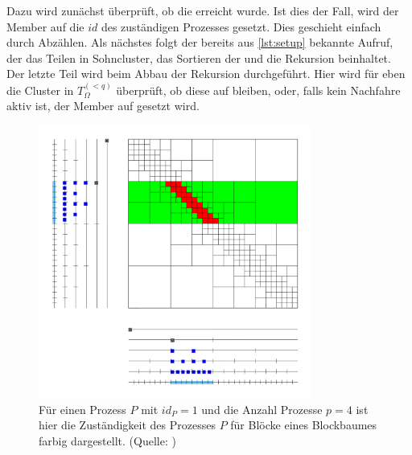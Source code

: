     
    Dazu wird zunächst überprüft, ob die  erreicht wurde. Ist dies der Fall, wird der Member  auf 
    die $id$ des zuständigen Prozesses gesetzt. Dies geschieht einfach durch Abzählen. Als nächstes folgt der bereits aus \autoref{lst:setup} bekannte Aufruf, der das Teilen in Sohncluster, das 
    Sortieren der  und die Rekursion beinhaltet. Der letzte Teil wird beim Abbau der Rekursion durchgeführt. Hier wird für eben die Cluster in $T_\Omega^{(<q)}$ überprüft, ob diese 
    auf  bleiben, oder, falls kein Nachfahre aktiv ist, der Member  auf  gesetzt wird.
    
    \begin{figure}[b]
      \includegraphics[width=0.8\textwidth]{img/verteilter_blockbaum.png}
      \caption{Für einen Prozess $P$ mit $id_P = 1$ und die Anzahl Prozesse $p = 4$ ist hier die Zuständigkeit des Prozesses $P$ für Blöcke eines Blockbaumes farbig dargestellt.
	       (Quelle: \citet{h2slides})}
      \label{fig:vertblock}
    \end{figure}
    
